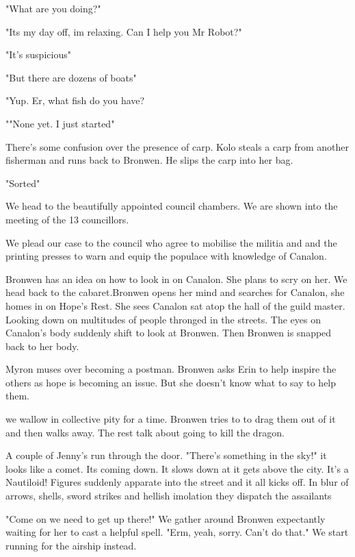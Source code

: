"What are you doing?"\medskip

"Its my day off, im relaxing. Can I help you Mr Robot?"\medskip

"It's suspicious"\medskip

"But there are dozens of boats"\medskip

"Yup. Er, what fish do you have?\medskip

""None yet. I just started"\medskip

There's some confusion over the presence of carp. Kolo steals a carp from another fisherman and runs back to Bronwen. He slips the carp into her bag.\medskip

"Sorted"\medskip

We head to the beautifully appointed council chambers. We are shown into the meeting of the 13 councillors.\medskip

We plead our case to the council who agree to mobilise the militia and and the printing presses to warn and equip the populace with knowledge of Canalon.\medskip

Bronwen has an idea on how to look in on Canalon. She plans to scry on her. We head back to the cabaret.Bronwen opens her mind and searches for Canalon, she homes in on Hope's Rest. She sees Canalon sat atop the hall of the guild master. Looking down on multitudes of people thronged in the streets. The eyes on Canalon's body suddenly shift to look at Bronwen. Then Bronwen is snapped back to her body.\medskip

Myron muses over becoming a postman. Bronwen asks Erin to help inspire the others as hope is becoming an issue. But she doesn't know what to say to help them.\medskip

we wallow in collective pity for a time. Bronwen tries to to drag them out of it and then walks away. The rest talk about going to kill the dragon.\medskip

A couple of Jenny's run through the door. "There's something in the sky!" it looks like a comet. Its coming down. It slows down at it gets above the city. It's a Nautiloid! Figures suddenly apparate into the street and it all kicks off. In blur of arrows, shells, sword strikes and hellish imolation they dispatch the assailants\medskip

"Come on we need to get up there!" We gather around Bronwen expectantly waiting for her to cast a helpful spell. "Erm, yeah, sorry. Can't do that." We start running for the airship instead.\medskip

\vspace*{5mm}
